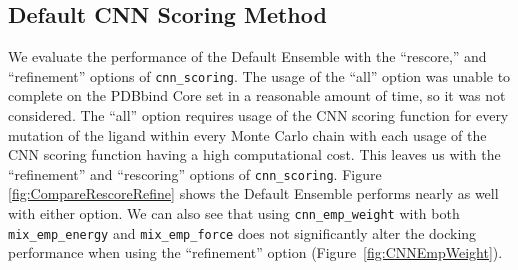 \documentclass[journal=jcisd8,manuscript=article]{achemso}
\begin{document}
\subsection{Default CNN Scoring Method}
 We evaluate the performance of the Default Ensemble with the ``rescore,'' and ``refinement'' options of \texttt{cnn\_scoring}. The usage of the ``all'' option was unable to complete on the PDBbind Core set in a reasonable amount of time, so it was not considered. The ``all'' option requires usage of the CNN scoring function for every mutation of the ligand within every Monte Carlo chain with each usage of the CNN scoring function having a high computational cost. This leaves us with the ``refinement'' and ``rescoring'' options of \texttt{cnn\_scoring}. Figure \ref{fig:CompareRescoreRefine} shows the Default Ensemble performs nearly as well with either option. We can also see that using \texttt{cnn\_emp\_weight} with both \texttt{mix\_emp\_energy} and \texttt{mix\_emp\_force} does not significantly alter the docking performance when using the ``refinement'' option (Figure~\ref{fig:CNNEmpWeight}).
\end{document}
